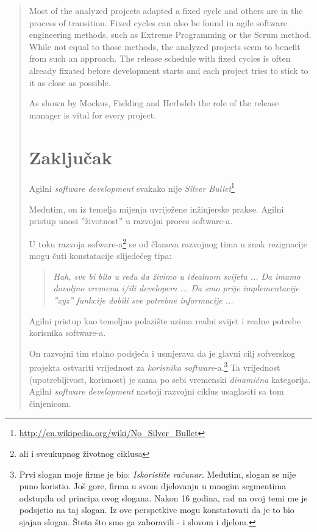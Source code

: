 \documentclass[lmodern, utf8, zavrsni]{fit}
\begin{document}
\begin{quote}
Most of the analyzed projects adapted a fixed cycle and others are in the process of transition. Fixed cycles can also be found in agile software engineering methods, such as Extreme Programming or the Scrum method. While not equal to those methods, the analyzed projects seem to benefit from such an approach. The release schedule with fixed cycles is often already fixated before development starts and each project tries to stick to it as close as possible.\citep[str. 95]{Siegel2012}

As shown by Mockus, Fielding and Herbsleb the role of the release manager is vital for every project.\citep[str. 95]{Siegel2012}


\chapter{Zaključak}

Agilni \emph{software development} svakako nije \emph{Silver Bullet}\footnote{\url{http://en.wikipedia.org/wiki/No_Silver_Bullet}}

Međutim, on iz temelja mijenja uvriježene inžinjerske prakse. Agilni pristup unosi ''životnost'' u razvojni proces software-a.

U toku razvoja sofware-a\footnote{ali i sveukupnog životnog ciklusa} se od članova razvojnog tima u znak rezignacije mogu čuti konstatacije slijedećeg tipa:
\begin{quotation}
  \emph{Hah, sve bi bilo u redu da živimo u idealnom svijetu ... Da imamo dovoljno vremena i/ili developera ... Da smo prije implementacije ''xyz'' funkcije dobili sve potrebne informacije ...}
\end{quotation}

Agilni pristup kao temeljno polazište uzima realni svijet i realne potrebe korisnika software-a.

On razvojni tim stalno podsjeća i usmjerava da je glavni cilj sofverskog projekta ostvariti vrijednost za \emph{korisnika software}-a.\footnote{Prvi slogan moje firme je bio: \emph{Iskoristite računar}. Međutim, slogan se nije puno koristio. Još gore, firma u svom djelovanju u mnogim segmentima odstupila od principa ovog slogana. Nakon 16 godina, rad na ovoj temi me je podsjetio na taj slogan. Iz ove perspetkive mogu konstatovati da je to bio sjajan slogan. Šteta što smo ga zaboravili - i slovom i djelom.}
Ta vrijednost (upotrebljivost, korisnost) je sama po sebi vremenski \emph{dinamična} kategorija. Agilni \emph{software development} nastoji razvojni ciklus usaglasiti sa tom činjenicom.


\end{quote}
\end{document}
